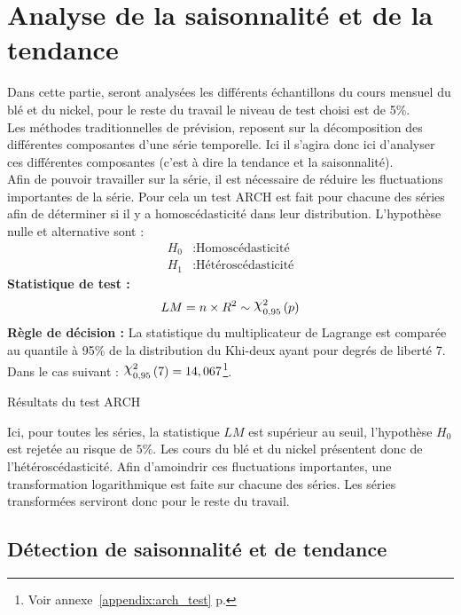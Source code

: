 \section{Analyse de la saisonnalité et de la tendance}
Dans cette partie, seront analysées les différents échantillons du cours mensuel du blé et du nickel, pour le reste du travail le niveau de test choisi est de 5\%.\\[11pt]
Les méthodes traditionnelles de prévision, reposent sur la décomposition des différentes composantes d'une série temporelle. Ici il s'agira donc
ici d'analyser ces différentes composantes (c'est à dire la tendance et la saisonnalité).\\[11pt]
Afin de pouvoir travailler sur la série, il est nécessaire de réduire les fluctuations importantes de la série. Pour cela un test ARCH est fait pour chacune des 
séries afin de déterminer si il y a homoscédasticité dans leur distribution. L'hypothèse nulle et alternative sont :
\begin{equation*}
    \begin{split}
        H_{0} &: \text{Homoscédasticité} \\
        H_{1} &: \text{Hétéroscédasticité}
    \end{split}
\end{equation*}
\textbf{Statistique de test :} 
    \begin{equation*}
        LM = n \times R^{2} \sim \rchi^{2}_{0,95} \, (p)
    \end{equation*}
\textbf{Règle de décision :} La statistique du multiplicateur de Lagrange est comparée au quantile à 95\% de la distribution du Khi-deux ayant pour degrés de liberté 7. 
Dans le cas suivant : $\rchi^{2}_{0,95}\,(7) = 14,067$\footnote{Voir annexe~\ref{appendix:arch_test} p.\pageref{appendix:arch_test}}.
\begin{table}[H]
    \centering
    \caption{Résultats du test ARCH}
    \sffamily
    
\end{table}
Ici, pour toutes les séries, la statistique $LM$ est supérieur au seuil, l'hypothèse $H_{0}$ est  rejetée au risque de $5\%$. Les cours du blé et du nickel
présentent donc de l'hétéroscédasticité. Afin d'amoindrir ces fluctuations importantes, une transformation logarithmique est faite sur chacune des séries. Les séries 
transformées serviront donc pour le reste du travail.
\subsection{Détection de saisonnalité et de tendance}
